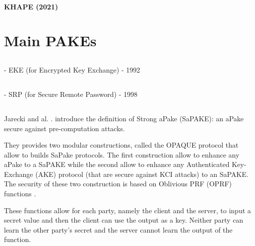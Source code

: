 \documentclass[../report.tex]{subfiles}
\begin{document}
\paragraph{KHAPE (2021)}





\section{Main PAKEs}


\subsection{}

- EKE (for Encrypted Key Exchange)
- 1992





\subsection{}
- SRP (for Secure Remote Password)
- 1998






\subsection{}


\paragraph{}
Jarecki and al. \cite{OPAQUE_Paper}. introduce the definition of Strong aPake (SaPAKE): an aPake secure against pre-computation attacks.

They provides two modular constructions, called the OPAQUE protocol that allow to builds SaPake protocols. The first construction allow to enhance any aPake to a SaPAKE while the second allow to enhance any Authenticated Key-Exchange (AKE) protocol (that are secure against KCI attacks) to an SaPAKE.
The security of these two construction is based on Oblivious PRF (OPRF) functions \cite{}.

These functions allow for each party, namely the client and the server, to input a secret value and then the client can use the output as a key. Neither party can learn the other party's secret and the server cannot learn the output of the function.
\end{document}
